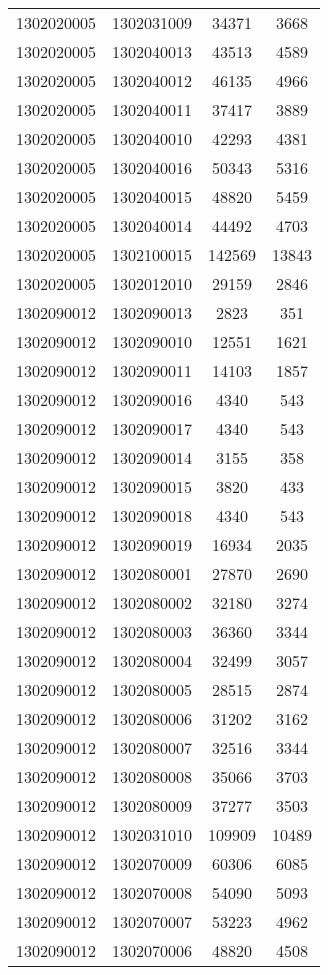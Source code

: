 \begin{longtable}{llcc}
1302020005 & 1302031009 & 34371 & 3668\\
1302020005 & 1302040013 & 43513 & 4589\\
1302020005 & 1302040012 & 46135 & 4966\\
1302020005 & 1302040011 & 37417 & 3889\\
1302020005 & 1302040010 & 42293 & 4381\\
1302020005 & 1302040016 & 50343 & 5316\\
1302020005 & 1302040015 & 48820 & 5459\\
1302020005 & 1302040014 & 44492 & 4703\\
1302020005 & 1302100015 & 142569 & 13843\\
1302020005 & 1302012010 & 29159 & 2846\\
1302090012 & 1302090013 & 2823 & 351\\
1302090012 & 1302090010 & 12551 & 1621\\
1302090012 & 1302090011 & 14103 & 1857\\
1302090012 & 1302090016 & 4340 & 543\\
1302090012 & 1302090017 & 4340 & 543\\
1302090012 & 1302090014 & 3155 & 358\\
1302090012 & 1302090015 & 3820 & 433\\
1302090012 & 1302090018 & 4340 & 543\\
1302090012 & 1302090019 & 16934 & 2035\\
1302090012 & 1302080001 & 27870 & 2690\\
1302090012 & 1302080002 & 32180 & 3274\\
1302090012 & 1302080003 & 36360 & 3344\\
1302090012 & 1302080004 & 32499 & 3057\\
1302090012 & 1302080005 & 28515 & 2874\\
1302090012 & 1302080006 & 31202 & 3162\\
1302090012 & 1302080007 & 32516 & 3344\\
1302090012 & 1302080008 & 35066 & 3703\\
1302090012 & 1302080009 & 37277 & 3503\\
1302090012 & 1302031010 & 109909 & 10489\\
1302090012 & 1302070009 & 60306 & 6085\\
1302090012 & 1302070008 & 54090 & 5093\\
1302090012 & 1302070007 & 53223 & 4962\\
1302090012 & 1302070006 & 48820 & 4508\\

\end{longtable}
